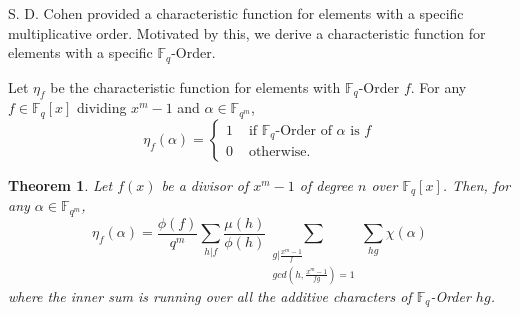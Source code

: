 \documentclass[12pt,a4paper]{article}
\theoremstyle{plain}
\newtheorem{thm}{Theorem}[section]
\theoremstyle{definition}
\numberwithin{equation}{section}
\begin{document}
     S. D. Cohen \cite{OrderRelated}  provided a characteristic function for elements with a specific multiplicative order. Motivated by this, we derive a characteristic function for elements with a specific \(\mathbb{F}_q\)-Order.
     
    Let $\eta_f$ be the characteristic function for elements with $\mathbb{F}_q$-Order $f$. For any $f \in \mathbb{F}_q[x]$ dividing $x^m-1$ and $\alpha \in \mathbb{F}_{q^m}$, 
     $$\eta_f(\alpha) = \begin{cases}
         1 & \text{ if } \mathbb{F}_q\text{-Order of } \alpha \text{ is } f\\
             0 & \text{ otherwise.}
     \end{cases}$$
     \begin{thm}\label{MainThm}
         Let $f(x)$ be a divisor of $x^m-1$ of degree $n$ over $\mathbb{F}_q[x]$. Then, for any $\alpha \in \mathbb{F}_{q^m}$,
         $$\eta_f(\alpha) = \displaystyle \frac{\phi(f)}{q^m}\sum_{h\vert f} \frac{\mu(h)}{\phi(h)} \sum_{\substack{g \vert \frac{x^m-1}{f}\\ gcd(h,\frac{x^m-1}{fg}) =1} } \sum_{hg} \chi(\alpha) $$  where the inner sum is running over all the additive characters of $\mathbb{F}_q$-Order $hg$.
     \end{thm}
\end{document}
